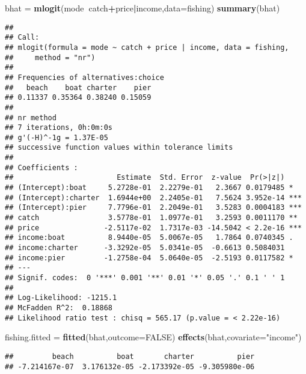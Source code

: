 \documentclass[
]{article}
\newenvironment{Shaded}{\begin{snugshade}}{\end{snugshade}}
\newcommand{\DataTypeTok}[1]{\textcolor[rgb]{0.13,0.29,0.53}{#1}}
\newcommand{\KeywordTok}[1]{\textcolor[rgb]{0.13,0.29,0.53}{\textbf{#1}}}
\newcommand{\NormalTok}[1]{#1}
\newcommand{\OperatorTok}[1]{\textcolor[rgb]{0.81,0.36,0.00}{\textbf{#1}}}
\newcommand{\OtherTok}[1]{\textcolor[rgb]{0.56,0.35,0.01}{#1}}
\newcommand{\StringTok}[1]{\textcolor[rgb]{0.31,0.60,0.02}{#1}}
\begin{document}
\begin{Shaded}
\begin{Highlighting}[]
\NormalTok{bhat                =}\StringTok{ }\KeywordTok{mlogit}\NormalTok{(mode}\OperatorTok{~}\NormalTok{catch}\OperatorTok{+}\NormalTok{price}\OperatorTok{|}\NormalTok{income,}\DataTypeTok{data=}\NormalTok{fishing)}
\KeywordTok{summary}\NormalTok{(bhat)}
\end{Highlighting}
\end{Shaded}

\begin{verbatim}
## 
## Call:
## mlogit(formula = mode ~ catch + price | income, data = fishing, 
##     method = "nr")
## 
## Frequencies of alternatives:choice
##   beach    boat charter    pier 
## 0.11337 0.35364 0.38240 0.15059 
## 
## nr method
## 7 iterations, 0h:0m:0s 
## g'(-H)^-1g = 1.37E-05 
## successive function values within tolerance limits 
## 
## Coefficients :
##                        Estimate  Std. Error  z-value  Pr(>|z|)    
## (Intercept):boat     5.2728e-01  2.2279e-01   2.3667 0.0179485 *  
## (Intercept):charter  1.6944e+00  2.2405e-01   7.5624 3.952e-14 ***
## (Intercept):pier     7.7796e-01  2.2049e-01   3.5283 0.0004183 ***
## catch                3.5778e-01  1.0977e-01   3.2593 0.0011170 ** 
## price               -2.5117e-02  1.7317e-03 -14.5042 < 2.2e-16 ***
## income:boat          8.9440e-05  5.0067e-05   1.7864 0.0740345 .  
## income:charter      -3.3292e-05  5.0341e-05  -0.6613 0.5084031    
## income:pier         -1.2758e-04  5.0640e-05  -2.5193 0.0117582 *  
## ---
## Signif. codes:  0 '***' 0.001 '**' 0.01 '*' 0.05 '.' 0.1 ' ' 1
## 
## Log-Likelihood: -1215.1
## McFadden R^2:  0.18868 
## Likelihood ratio test : chisq = 565.17 (p.value = < 2.22e-16)
\end{verbatim}

\begin{Shaded}
\begin{Highlighting}[]
\NormalTok{fishing.fitted      =}\StringTok{ }\KeywordTok{fitted}\NormalTok{(bhat,}\DataTypeTok{outcome=}\OtherTok{FALSE}\NormalTok{)}
\KeywordTok{effects}\NormalTok{(bhat,}\DataTypeTok{covariate=}\StringTok{"income"}\NormalTok{)}
\end{Highlighting}
\end{Shaded}

\begin{verbatim}
##         beach          boat       charter          pier 
## -7.214167e-07  3.176132e-05 -2.173392e-05 -9.305980e-06
\end{verbatim}
\end{document}
